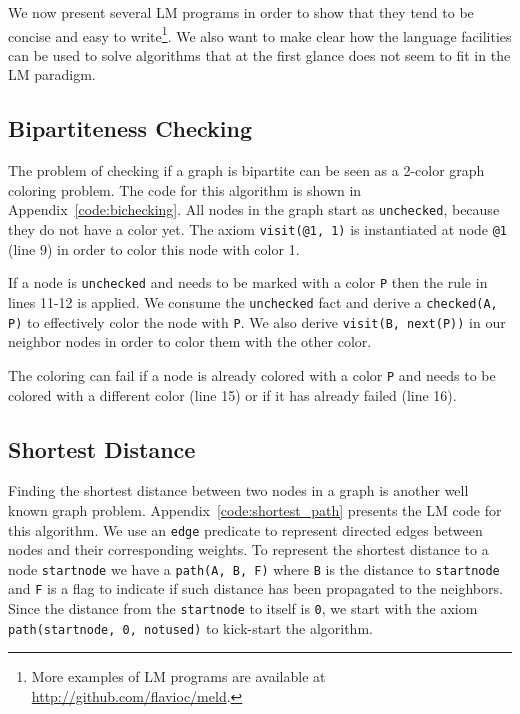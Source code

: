 
We now present several LM programs in order to show that they tend to
be concise and easy to write\footnote{More examples of LM programs are available at \url{http://github.com/flavioc/meld}.}. We also want to make clear how the
language facilities can be used to solve algorithms that at the first
glance does not seem to fit in the LM paradigm.

\subsection{Bipartiteness Checking}

The problem of checking if a graph is bipartite can be seen as a 2-color graph coloring problem.
The code for this algorithm is shown in Appendix~\ref{code:bichecking}. All nodes in the graph
start as \texttt{unchecked}, because they do not have a color yet. The axiom \texttt{visit(@1, 1)} is
instantiated at node \texttt{@1} (line 9) in order to color this node with color 1.

If a node is \texttt{unchecked} and needs to be marked with a color \texttt{P} then the rule in
lines 11-12 is applied. We consume the \texttt{unchecked} fact and derive a \texttt{checked(A, P)}
to effectively color the node with \texttt{P}. We also derive \texttt{visit(B, next(P))} in
our neighbor nodes in order to color them with the other color.

The coloring can fail if a node is already colored with a color \texttt{P} and needs to be colored
with a different color (line 15) or if it has already failed (line 16).

\subsection{Shortest Distance}

Finding the shortest distance between two nodes in a graph is another well known graph problem.
Appendix~\ref{code:shortest_path} presents the LM code for this algorithm. We use an \texttt{edge}
predicate to represent directed edges between nodes and their corresponding weights. To represent the shortest
distance to a node \texttt{startnode} we have a \texttt{path(A, B, F)} where \texttt{B} is the distance to \texttt{startnode}
and \texttt{F} is a flag to indicate if such distance has been propagated to the neighbors. Since the distance from
the \texttt{startnode} to itself is \texttt{0}, we start with the axiom \texttt{path(startnode, 0, notused)} to kick-start
the algorithm.

